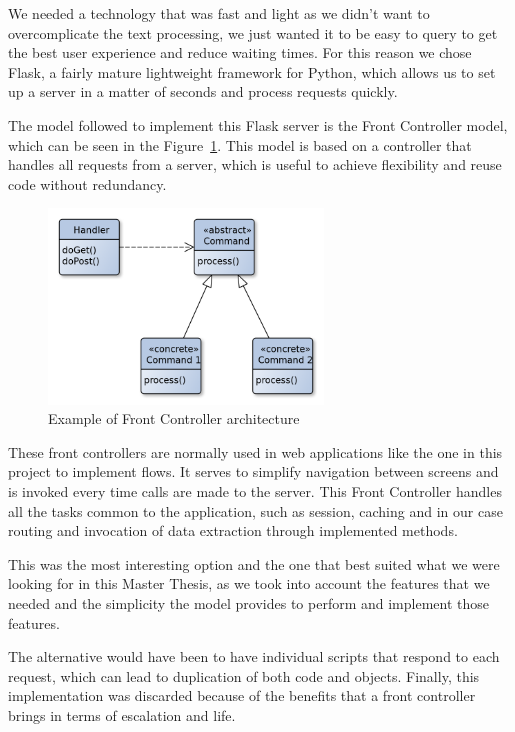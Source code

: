  We needed a technology that was fast and light as we didn't want to overcomplicate the text processing, we just wanted it to be easy to query to get the best user experience and reduce waiting times. For this reason we chose Flask, a fairly mature lightweight framework for Python, which allows us to set up a server in a matter of seconds and process requests quickly.
 
 
 
 The model followed to implement this Flask server is the Front Controller model, which can be seen in the Figure~\ref{fig:front-controller}. This model is based on a controller that handles all requests from a server, which is useful to achieve flexibility and reuse code without redundancy.

 
\begin{figure}[h]
    \centering
    \includegraphics[width=0.65\textwidth]{img/architecture/Front_Controller.png}
    \caption{Example of Front Controller architecture}
    \label{fig:front-controller}
\end{figure}

These front controllers are normally used in web applications like the one in this project to implement flows. It serves to simplify navigation between screens and is invoked every time calls are made to the server. This Front Controller handles all the tasks common to the application, such as session, caching and in our case routing and invocation of data extraction through implemented methods.

This was the most interesting option and the one that best suited what we were looking for in this Master Thesis, as we took into account the features that we needed and the simplicity the model provides to perform and implement those features. 

The alternative would have been to have individual scripts that respond to each request, which can lead to duplication of both code and objects. Finally, this implementation was discarded because of the benefits that a front controller brings in terms of escalation and life.

